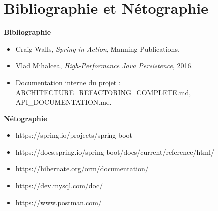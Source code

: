 \chapter*{Bibliographie et Nétographie}

\textbf{Bibliographie}
\begin{itemize}
  \item [1] Craig Walls, \textit{Spring in Action}, Manning Publications.
  \item [2] Vlad Mihalcea, \textit{High-Performance Java Persistence}, 2016.
  \item [3] Documentation interne du projet : ARCHITECTURE\_REFACTORING\_COMPLETE.md, API\_DOCUMENTATION.md.
\end{itemize}

\textbf{Nétographie}
\begin{itemize}
  \item https://spring.io/projects/spring-boot
  \item https://docs.spring.io/spring-boot/docs/current/reference/html/
  \item https://hibernate.org/orm/documentation/
  \item https://dev.mysql.com/doc/
  \item https://www.postman.com/
\end{itemize}

